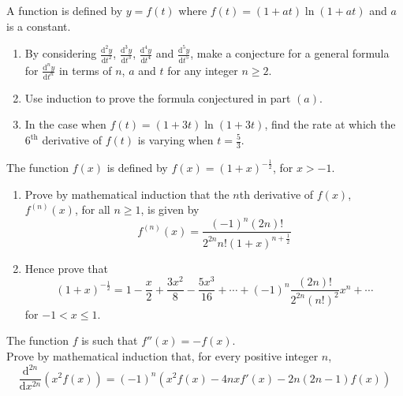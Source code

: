 \documentclass[leqno]{article}
\begin{document}
\begin{enumerate}[
  label=\textbf{\arabic*.},
  leftmargin=*,
  topsep=0pt,
  partopsep=0pt,
  parsep=0pt
]
A function is defined by $y=f(t)$ where $f(t)=(1+at)\ln(1+at)$ and $a$ is a constant. \\

\begin{enumerate}[label=\textbf{(\alph*)}]
  \item By considering $\frac{\mathrm{d}^2y}{\mathrm{d}t^2}$, $\frac{\mathrm{d}^3y}{\mathrm{d}t^3}$, $\frac{\mathrm{d}^4y}{\mathrm{d}t^4}$ and $\frac{\mathrm{d}^5y}{\mathrm{d}t^5}$, make a conjecture for a general formula for $\frac{\mathrm{d}^n y}{\mathrm{d}t^n}$ in terms of $n$, $a$ and $t$ for any integer $n \ge 2$.  \\
  \item Use induction to prove the formula conjectured in part $(a)$.  \\
  \item In the case when $f(t)=(1+3t)\ln(1+3t)$, find the rate at which the $6^{\mathrm{th}}$ derivative of $f(t)$ is varying when $t=\frac{5}{3}$.  \\
\end{enumerate}


\newpage

\questionitem

The function $f(x)$ is defined by $f(x)=(1+x)^{-\frac12}$, for $x>-1$. \\

\begin{enumerate}[label=\textbf{(\alph*)}]
  \item Prove by mathematical induction that the $n$th derivative of $f(x)$, $f^{(n)}(x)$, for all $n \ge 1$, is given by
  \[
  f^{(n)}(x)=\frac{(-1)^n(2n)!}{2^{2n}n!(1+x)^{n+\frac12}}
  \]
  \item Hence prove that
  \[
  (1+x)^{-\frac12}=1-\frac{x}{2}+\frac{3x^2}{8}-\frac{5x^3}{16}+\cdots+(-1)^n\frac{(2n)!}{2^{2n}(n!)^2}x^n+\cdots
  \]
  for $-1<x\le 1$.  \\
\end{enumerate}

\newpage

\questionitem

The function $f$ is such that $f''(x)=-f(x)$. \\

Prove by mathematical induction that, for every positive integer $n$,
\[
\frac{\mathrm{d}^{2n}}{\mathrm{d}x^{2n}}\left(x^2f(x)\right)=(-1)^n\left(x^2f(x)-4nxf'(x)-2n(2n-1)f(x)\right)
\] 


\end{enumerate}
\end{document}
